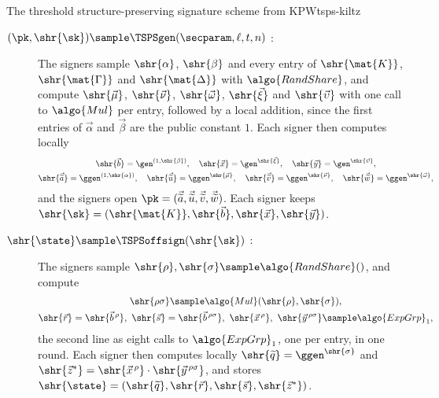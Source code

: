 \begin{protocolbox}{The threshold structure-preserving signature scheme from KPW}{tsps-kiltz}

  \begin{description}

    \item[$(\pk, \shr{\sk}) \sample \TSPSgen(\secparam, \ell, t, n)$ :] The
signers sample $\shr{\alpha}$, $\shr{\beta}$ and every entry of $\shr{\mat{K}}$,
$\shr{\mat{\Gamma}}$ and $\shr{\mat{\Delta}}$ with $\algo{RandShare}$, and
compute $\shr{\vec{\mu}}$, $\shr{\vec{\nu}}$, $\shr{\vec{\omega}}$,
$\shr{\vec{\xi}}$ and $\shr{\vec{\upsilon}}$ with one call to $\algo{Mul}$ per
entry, followed by a local addition, since the first entries of $\vec{\alpha}$ and
$\vec{\beta}$ are the public constant $1$. Each signer then
computes locally
      \begin{gather*}
	\shr{\vec{b}} = \gen^{(1, \shr{\beta})}, \quad \shr{\vec{x}} =
\gen^{\shr{\vec{\xi}}}, \quad \shr{\vec{y}} = \gen^{\shr{\vec{\upsilon}}}, \\
	\shr{\vec{\widetilde{a}}} = \ggen^{(1, \shr{\alpha})}, \quad
\shr{\vec{\widetilde{u}}} = \ggen^{\shr{\vec{\mu}}}, \quad
\shr{\vec{\widetilde{v}}} = \ggen^{\shr{\vec{\nu}}}, \quad
\shr{\vec{\widetilde{w}}} = \ggen^{\shr{\vec{\omega}}},
      \end{gather*}
      and the signers open $\pk = (\vec{\widetilde{a}}, \vec{\widetilde{u}},
\vec{\widetilde{v}}, \vec{\widetilde{w}})$. Each signer keeps $\shr{\sk} =
(\shr{\mat{K}}, \shr{\vec{b}}, \shr{\vec{x}}, \shr{\vec{y}})$.

    \item[$\shr{\state} \sample \TSPSoffsign(\shr{\sk})$ :] The signers sample
$\shr{\rho}, \shr{\sigma} \sample \algo{RandShare}()$, and compute
      \begin{gather*}
	\shr{\rho\sigma} \sample \algo{Mul}(\shr{\rho}, \shr{\sigma}), \\
	\shr{\vec{r}} = \shr{\vec{b}^{\,\rho}}, \ \shr{\vec{s}} =
\shr{\vec{b}^{\,\rho\sigma}}, \ \shr{\vec{x}^{\,\rho}}, \
\shr{\vec{y}^{\,\rho\sigma}} \sample \algo{ExpGrp}_1,
      \end{gather*}
      the second line as eight calls to $\algo{ExpGrp}_1$, one per entry, in one
round.
      Each signer then computes locally $\shr{\widetilde{q}} =
\ggen^{\shr{\sigma}}$ and $\shr{\vec{z}^*} = \shr{\vec{x}^{\,\rho}} \cdot
\shr{\vec{y}^{\,\rho\sigma}}$, and stores $\shr{\state} = (\shr{\widetilde{q}},
\shr{\vec{r}}, \shr{\vec{s}}, \shr{\vec{z}^*})$.


\end{description}
\end{protocolbox}
